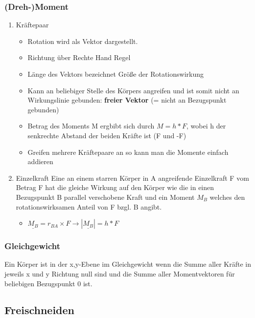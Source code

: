 \documentclass[11pt]{article}
\begin{document}
\subsubsection{(Dreh-)Moment}
\label{sec:orgdeec4d9}
\begin{enumerate}
\item Kräftepaar
\label{sec:org1a01c98}
\begin{itemize}
\item Rotation wird als Vektor dargestellt.
\item Richtung über Rechte Hand Regel
\item Länge des Vektors bezeichnet Größe der Rotationswirkung
\item Kann an beliebiger Stelle des Körpers angreifen und ist somit nicht an Wirkungslinie gebunden: \textbf{freier Vektor} (= nicht an Bezugspunkt gebunden)
\item Betrag des Moments M ergbibt sich durch \(M = h*F\), wobei h der senkrechte Abstand der beiden Kräfte ist (F und -F)
\item Greifen mehrere Kräftepaare an so kann man die Momente einfach addieren
\end{itemize}
\item Einzelkraft
\label{sec:org3bcc962}
Eine an einem starren Körper in A angreifende Einzelkraft F vom Betrag F hat die gleiche Wirkung auf den Körper wie die in einen Bezugspunkt B parallel verschobene Kraft und ein Moment \(M_B\) welches den rotationswirksamen Anteil von F bzgl. B angibt.
\begin{itemize}
\item \(\underline{M_B} = r_{BA} \times F \rightarrow |\underline{M_B}| = h*F\)
\end{itemize}
\end{enumerate}
\subsubsection{Gleichgewicht}
\label{sec:orgfc9449c}
Ein Körper ist in der x,y-Ebene im Gleichgewicht wenn die Summe aller Kräfte in jeweils x und y Richtung null sind und die Summe aller Momentvektoren für beliebigen Bezugspunkt 0 ist.

\subsection{Freischneiden}
\label{sec:orgd7ad973}
\end{document}
